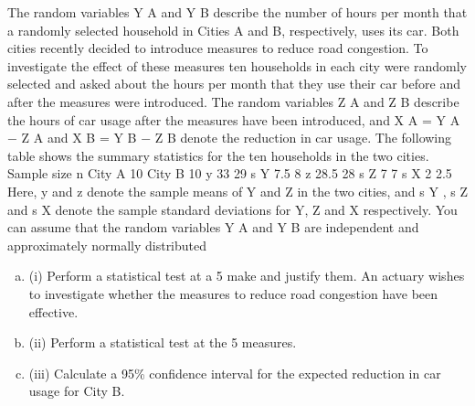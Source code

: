 \documentclass[a4paper,12pt]{article}
\begin{document}
The random variables Y A and Y B describe the number of hours per month that a
randomly selected household in Cities A and B, respectively, uses its car. Both cities
recently decided to introduce measures to reduce road congestion. To investigate the
effect of these measures ten households in each city were randomly selected and
asked about the hours per month that they use their car before and after the measures
were introduced. The random variables Z A and Z B describe the hours of car usage
after the measures have been introduced, and X A = Y A − Z A and X B = Y B − Z B
denote the reduction in car usage. The following table shows the summary statistics
for the ten households in the two cities.
Sample size n
City A
10
City B
10
y
33
29
s Y
7.5
8
z
28.5
28
s Z
7
7
s X
2
2.5
Here, y and z denote the sample means of Y and Z in the two cities, and s Y , s Z
and s X denote the sample standard deviations for Y, Z and X respectively.
You can assume that the random variables Y A and Y B are independent and
approximately normally distributed

\begin{enumerate}[(a)]
\item (i)
Perform a statistical test at a 5%
make and justify them.
\medskip
An actuary wishes to investigate whether the measures to reduce road congestion have been effective.
\item (ii) Perform a statistical test at the 5%
measures.

\item (iii) Calculate a 95\% confidence interval for the expected reduction in car usage
for City B.
\end{enumerate}
\end{document}

